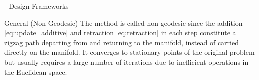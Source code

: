 \documentclass[journal]{IEEEtran}
\begin{document}
\begin{section}{- Design Frameworks}
\begin{subsection}{General (Non-Geodesic) }
		The method is called non-geodesic since the addition \eqref{eq:update_additive} and retraction \eqref{eq:retraction} in each step constitute a zigzag path departing from and returning to the manifold, instead of carried directly on the manifold.
		It converges to stationary points of the original problem but usually requires a large number of iterations due to inefficient operations in the Euclidean space.
	\end{subsection}



\end{section}
\end{document}
